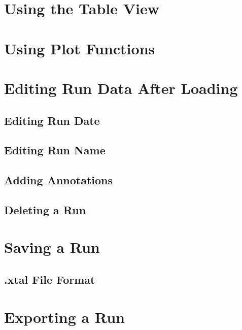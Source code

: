 \documentclass[letterpaper,10pt,english]{sphinxmanual}
\begin{document}
\section{Using the Table View}
\label{\detokenize{user_guide:using-the-table-view}}

\section{Using Plot Functions}
\label{\detokenize{user_guide:using-plot-functions}}

\section{Editing Run Data After Loading}
\label{\detokenize{user_guide:editing-run-data-after-loading}}

\subsection{Editing Run Date}
\label{\detokenize{user_guide:editing-run-date}}

\subsection{Editing Run Name}
\label{\detokenize{user_guide:editing-run-name}}

\subsection{Adding Annotations}
\label{\detokenize{user_guide:adding-annotations}}

\subsection{Deleting a Run}
\label{\detokenize{user_guide:deleting-a-run}}

\section{Saving a Run}
\label{\detokenize{user_guide:saving-a-run}}

\subsection{.xtal File Format}
\label{\detokenize{user_guide:xtal-file-format}}

\section{Exporting a Run}
\label{\detokenize{user_guide:exporting-a-run}}
\end{document}
